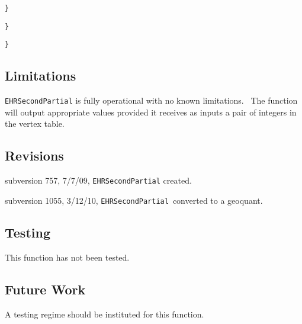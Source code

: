 \qquad\qquad\qquad\qquad\texttt{\}}

\qquad\qquad\qquad\texttt{\}}

\qquad\qquad\texttt{\}}

\subsection*{Limitations}

\texttt{EHRSecondPartial} is fully operational with no known limitations. \
The function will output appropriate values provided it receives as inputs a
pair of integers in the vertex table. \ 

\subsection*{Revisions}

subversion 757, 7/7/09, \texttt{EHRSecondPartial} created.

subversion 1055, 3/12/10, \texttt{EHRSecondPartial}\ converted to a geoquant.

\subsection*{Testing}

This function has not been tested.

\subsection*{Future Work}

A testing regime should be instituted for this function. \ 
